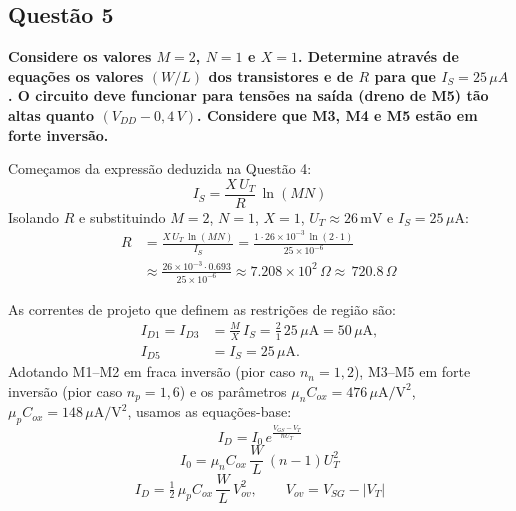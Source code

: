 \documentclass[12pt,a4paper]{article}
\begin{document}
\subsection*{Questão 5}
\begin{BoxQ}
    \textbf{Considere os valores $M = 2$, $N = 1$ e $X = 1$. Determine através de equações os valores $(W/L)$ dos transistores e de $R$ para que $I_S = 25\,\mu A$. O circuito deve funcionar para tensões na saída (dreno de M5) tão altas quanto $(V_{DD} - 0{,}4\,V)$. Considere que M3, M4 e M5 estão em forte inversão.}
\end{BoxQ}

Começamos da expressão deduzida na Questão 4:
\begin{equation}
    I_S = \frac{X\,U_T}{R}\,\ln(MN)
\end{equation}
Isolando $R$ e substituindo $M=2$, $N=1$, $X=1$, $U_T\approx 26\,\text{mV}$ e $I_S=25\,\mu\text{A}$:
\begin{align} %
    R 
    &= \frac{X\,U_T\,\ln(MN)}{I_S}
     = \frac{1\cdot 26\times 10^{-3}\,\ln(2\cdot 1)}{25\times 10^{-6}} \\[4pt]
    &\approx \frac{26\times 10^{-3}\cdot 0.693}{25\times 10^{-6}}
     \approx 7.208\times 10^{2} \, \Omega
     \approx \boxed{\,720.8\,\Omega\,}
\end{align}

As correntes de projeto que definem as restrições de região são:
\begin{align}
    I_{D1} = I_{D3} &= \frac{M}{X}\,I_S = \frac{2}{1}\,25\,\mu\text{A} = 50\,\mu\text{A}, \\
    I_{D5} &= I_S = 25\,\mu\text{A}.
\end{align}
Adotando M1–M2 em fraca inversão (pior caso $n_n=1{,}2$), M3–M5 em forte inversão (pior caso $n_p=1{,}6$) e os parâmetros $\mu_n C_{ox}=476\,\mu\text{A}/\text{V}^2$, $\mu_p C_{ox}=148\,\mu\text{A}/\text{V}^2$, usamos as equações-base:
\begin{equation}\label{eq:weak-id}
I_D = I_0\, e^{\tfrac{V_{GS}-V_T}{nU_T}}
\end{equation}
\begin{equation}\label{eq:I0}
I_0 = \mu_n C_{ox}\,\frac{W}{L}\,(n-1)U_T^2
\end{equation}
\begin{equation}\label{eq:strong-id}
I_D = \tfrac{1}{2}\,\mu_p C_{ox}\,\frac{W}{L}\,V_{ov}^2,\qquad V_{ov}=V_{SG}-|V_T|
\end{equation}
\end{document}
